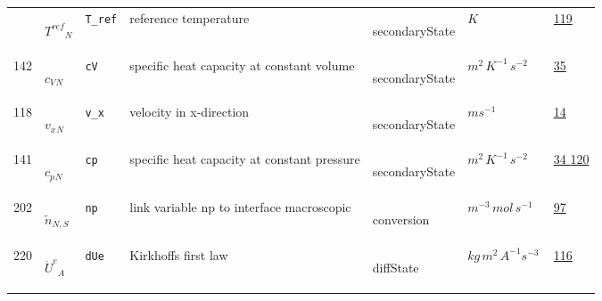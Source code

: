 \begin{longtable}{|p{1cm}|p{2.5cm}|p{4.5cm}|p{8cm}|p{3.0cm}|p{3cm}|p{1cm}|}
             & \hypertarget{"v:222"}{ $ {{T^{ref}}}{_{N}} $}
             & \verb|T_ref|
             & reference temperature
             & \begin{lay}secondaryState \end{lay}
             & $ K \, $
             &                 \hyperlink{"e:119"}{ 119 }
                 \\
            142
             & \hypertarget{"v:142"}{ $ {{c_V}}{_{N}} $}
             & \verb|cV|
             & specific heat capacity at constant volume
             & \begin{lay}secondaryState \end{lay}
             & $ m^{2} \,K^{-1} \,s^{-2} \, $
             &                 \hyperlink{"e:35"}{ 35 }
                 \\
            118
             & \hypertarget{"v:118"}{ $ {{v_x}}{_{N}} $}
             & \verb|v_x|
             & velocity in x-direction
             & \begin{lay}secondaryState \end{lay}
             & $ m s^{-1} \, $
             &                 \hyperlink{"e:14"}{ 14 }
                 \\
            141
             & \hypertarget{"v:141"}{ $ {{c_p}}{_{N}} $}
             & \verb|cp|
             & specific heat capacity at constant pressure
             & \begin{lay}secondaryState \end{lay}
             & $ m^{2} \,K^{-1} \,s^{-2} \, $
             &                 \hyperlink{"e:34"}{ 34 }
                                 \hyperlink{"e:120"}{ 120 }
                 \\
            202
             & \hypertarget{"v:202"}{ $ {{\tilde{n}}}{_{N, S}} $}
             & \verb|np|
             & link variable  np to interface macroscopic
             & \begin{lay}conversion \end{lay}
             & $ m^{-3} \,mol \,s^{-1} \, $
             &                 \hyperlink{"e:97"}{ 97 }
                 \\
            220
             & \hypertarget{"v:220"}{ $ {{\dot{U}^e}}{_{A}} $}
             & \verb|dUe|
             & Kirkhoffs first law
             & \begin{lay}diffState \end{lay}
             & $ kg \,m^{2} \,A^{-1} s^{-3} \, $
             &                 \hyperlink{"e:116"}{ 116 }
                 \\

\end{longtable}
